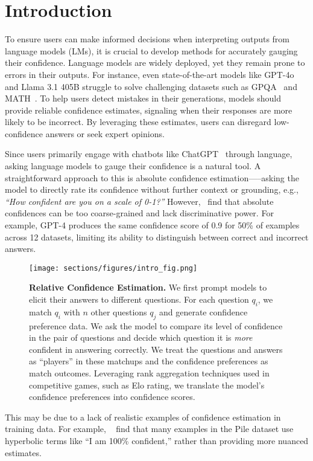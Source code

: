 \section{Introduction}
To ensure users can make informed decisions when interpreting outputs from language models (LMs), it is crucial to develop methods for accurately gauging their confidence. Language models are widely deployed, yet they remain prone to errors in their outputs. For instance, even state-of-the-art models like GPT-4o and Llama 3.1 405B struggle to solve challenging datasets such as GPQA~\citep{Rein2023GPQAAG} and MATH~\citep{math}. To help users detect mistakes in their generations, models should provide reliable confidence estimates, signaling when their responses are more likely to be incorrect. By leveraging these estimates, users can disregard low-confidence answers or seek expert opinions.


Since users primarily engage with chatbots like ChatGPT~\citep{chatgpt} through language, asking language models to gauge their confidence is a natural tool.
A straightforward approach to this is absolute confidence estimation—--asking the model to directly rate its confidence without further context or grounding, e.g., \textit{``How confident are you on a scale of 0-1?''} However,~\cite{surrogate-models} find that absolute confidences can be too coarse-grained and lack discriminative power. For example, GPT-4 produces the same confidence score of 0.9 for 50\% of examples across 12 datasets, limiting its ability to distinguish between correct and incorrect answers. 
\begin{figure}
    \centering
    \texttt{[image: sections/figures/intro\_fig.png]} 
    \caption{\textbf{Relative Confidence Estimation.} We first prompt models to elicit their answers to different questions. For each question $q_i$, we match $q_i$ with $n$ other questions $q_j$ and generate confidence preference data. We ask the model to compare its level of confidence in the pair of questions and decide which question it is \textit{more} confident in answering correctly. We treat the questions and answers as ``players'' in these matchups and the confidence preferences as match outcomes. Leveraging rank aggregation techniques used in competitive games, such as Elo rating, we translate the model's confidence preferences into confidence scores.}
    \label{fig:intro-fig}
    \vspace{-0.2in}
\end{figure}
This may be due to a lack of realistic examples of confidence estimation in training data. For example, ~\cite{zhou2023navigating} find that many examples in the Pile dataset use hyperbolic terms like “I am 100\% confident,” rather than providing more nuanced estimates.

